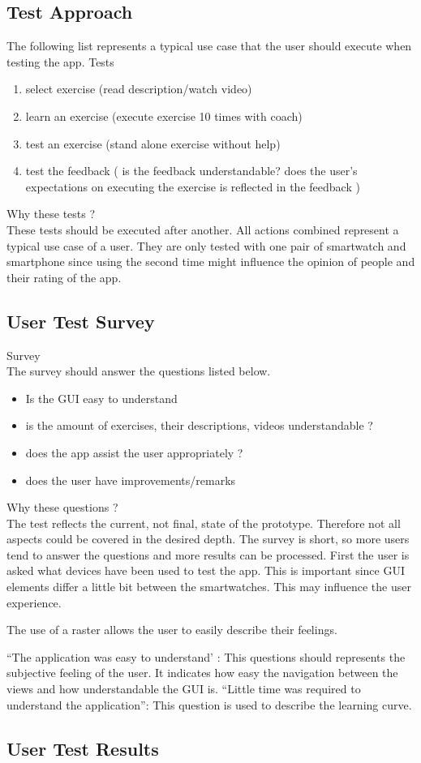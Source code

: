 \subsection{Test Approach}
The following list represents a typical use case that the user should execute when testing the app.
Tests\\

\begin{enumerate}
\item select exercise (read description/watch video)
\item learn an exercise (execute exercise 10 times with coach)
\item test an exercise (stand alone exercise without help)
\item test the feedback ( is the feedback understandable? does the user's expectations on executing the exercise is reflected in the feedback )
\end{enumerate}

Why these tests ? \\
These tests should be executed after another. All actions combined represent a typical use case of a user.
They are only tested with one pair of smartwatch and smartphone since using the second time might influence the opinion of people and their rating of the app.

\subsection{User Test Survey}
Survey\\
The survey should answer the questions listed below.
\begin{itemize}
\item Is the GUI easy to understand
\item is the amount of exercises, their descriptions, videos understandable ?
\item does the app assist the user appropriately ?
\item does the user have improvements/remarks
\end{itemize}

Why these questions ?\\
The test reflects the current, not final, state of the prototype. Therefore not all aspects could be covered in the desired depth.
The survey is short, so more users tend to answer the questions and more results can be processed.
First the user is asked what devices have been used to test the app. This is important since GUI elements differ a little bit between the smartwatches. This may influence the user experience.

The use of a raster allows the user to easily describe their feelings.

“The application was easy to understand’ : This questions should represents the subjective feeling of the user. It indicates how easy the navigation between the views  and how understandable the GUI is.
“Little time was required to understand the application”: This question is used to describe the learning curve.

\subsection{User Test Results}
